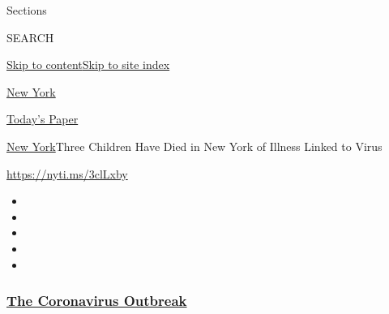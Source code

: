 Sections

SEARCH

\protect\hyperlink{site-content}{Skip to
content}\protect\hyperlink{site-index}{Skip to site index}

\href{https://www.nytimes3xbfgragh.onion/section/nyregion}{New York}

\href{https://myaccount.nytimes3xbfgragh.onion/auth/login?response_type=cookie\&client_id=vi}{}

\href{https://www.nytimes3xbfgragh.onion/section/todayspaper}{Today's
Paper}

\href{/section/nyregion}{New York}\textbar{}Three Children Have Died in
New York of Illness Linked to Virus

\url{https://nyti.ms/3clLxby}

\begin{itemize}
\item
\item
\item
\item
\item
\end{itemize}

\hypertarget{the-coronavirus-outbreak}{%
\subsubsection{\texorpdfstring{\href{https://www.nytimes3xbfgragh.onion/news-event/coronavirus?name=styln-coronavirus-national\&region=TOP_BANNER\&variant=undefined\&block=storyline_menu_recirc\&action=click\&pgtype=Article\&impression_id=5d883de0-e39a-11ea-a48e-b9252519409f}{The
Coronavirus
Outbreak}}{The Coronavirus Outbreak}}\label{the-coronavirus-outbreak}}

